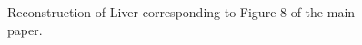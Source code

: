 \documentclass{article}
\begin{document}
\begin{figure}[!h]
\caption[Representative results-2]{Reconstruction of Liver corresponding to Figure 8 of the main paper.}
\label{fig:RFA2_few_views_biggerIm}
\end{figure}
\newpage
\end{document}
